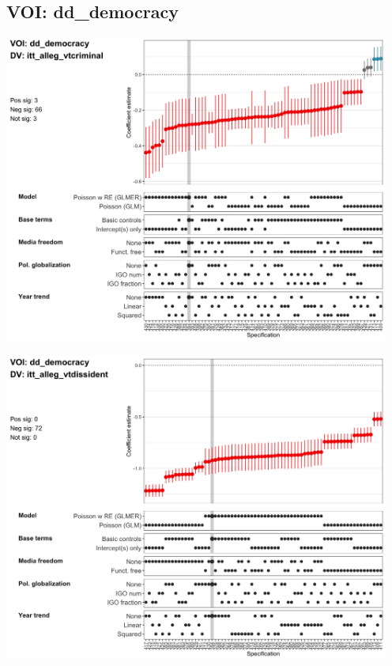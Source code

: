 \documentclass[]{article}
\begin{document}
\hypertarget{voi-dd_democracy}{%
\subsection{VOI: dd\_democracy}\label{voi-dd_democracy}}

\includegraphics[height=4in]{../output/figures-robustness/specplot-dd_democracy-itt_alleg_vtcriminal.png}

\includegraphics[height=4in]{../output/figures-robustness/specplot-dd_democracy-itt_alleg_vtdissident.png}
\end{document}
